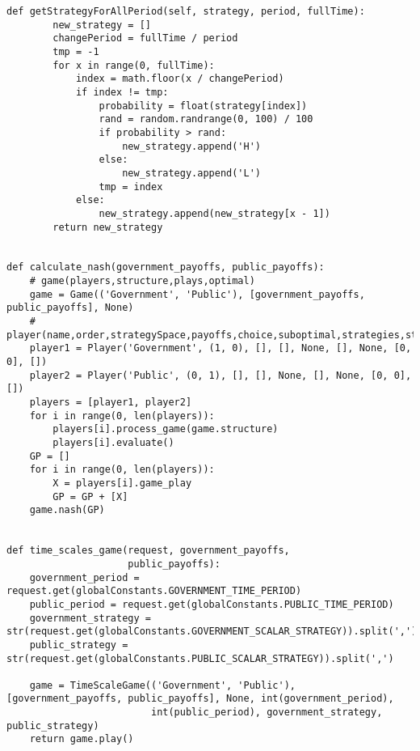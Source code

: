 \begin{lstlisting}[style=fsharpstyle]
    def getStrategyForAllPeriod(self, strategy, period, fullTime):
        new_strategy = []
        changePeriod = fullTime / period
        tmp = -1
        for x in range(0, fullTime):
            index = math.floor(x / changePeriod)
            if index != tmp:
                probability = float(strategy[index])
                rand = random.randrange(0, 100) / 100
                if probability > rand:
                    new_strategy.append('H')
                else:
                    new_strategy.append('L')
                tmp = index
            else:
                new_strategy.append(new_strategy[x - 1])
        return new_strategy


def calculate_nash(government_payoffs, public_payoffs):
    # game(players,structure,plays,optimal)
    game = Game(('Government', 'Public'), [government_payoffs, public_payoffs], None)
    # player(name,order,strategySpace,payoffs,choice,suboptimal,strategies,state,gameplay):
    player1 = Player('Government', (1, 0), [], [], None, [], None, [0, 0], [])
    player2 = Player('Public', (0, 1), [], [], None, [], None, [0, 0], [])
    players = [player1, player2]
    for i in range(0, len(players)):
        players[i].process_game(game.structure)
        players[i].evaluate()
    GP = []
    for i in range(0, len(players)):
        X = players[i].game_play
        GP = GP + [X]
    game.nash(GP)


def time_scales_game(request, government_payoffs,
                     public_payoffs):
    government_period = request.get(globalConstants.GOVERNMENT_TIME_PERIOD)
    public_period = request.get(globalConstants.PUBLIC_TIME_PERIOD)
    government_strategy = str(request.get(globalConstants.GOVERNMENT_SCALAR_STRATEGY)).split(',')
    public_strategy = str(request.get(globalConstants.PUBLIC_SCALAR_STRATEGY)).split(',')

    game = TimeScaleGame(('Government', 'Public'), [government_payoffs, public_payoffs], None, int(government_period),
                         int(public_period), government_strategy, public_strategy)
    return game.play()


 \end{lstlisting}
